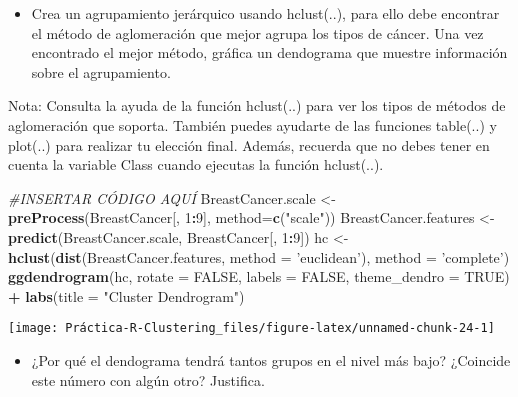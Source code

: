 \documentclass[]{article}
\newenvironment{Shaded}{\begin{snugshade}}{\end{snugshade}}
\newcommand{\CommentTok}[1]{\textcolor[rgb]{0.56,0.35,0.01}{\textit{#1}}}
\newcommand{\DataTypeTok}[1]{\textcolor[rgb]{0.13,0.29,0.53}{#1}}
\newcommand{\DecValTok}[1]{\textcolor[rgb]{0.00,0.00,0.81}{#1}}
\newcommand{\KeywordTok}[1]{\textcolor[rgb]{0.13,0.29,0.53}{\textbf{#1}}}
\newcommand{\NormalTok}[1]{#1}
\newcommand{\OperatorTok}[1]{\textcolor[rgb]{0.81,0.36,0.00}{\textbf{#1}}}
\newcommand{\OtherTok}[1]{\textcolor[rgb]{0.56,0.35,0.01}{#1}}
\newcommand{\StringTok}[1]{\textcolor[rgb]{0.31,0.60,0.02}{#1}}
\providecommand{\tightlist}{%
  \setlength{\itemsep}{0pt}\setlength{\parskip}{0pt}}
\begin{document}
\begin{itemize}
\tightlist
\item
  Crea un agrupamiento jerárquico usando hclust(..), para ello debe
  encontrar el método de aglomeración que mejor agrupa los tipos de
  cáncer. Una vez encontrado el mejor método, gráfica un dendograma que
  muestre información sobre el agrupamiento.
\end{itemize}

Nota: Consulta la ayuda de la función hclust(..) para ver los tipos de
métodos de aglomeración que soporta. También puedes ayudarte de las
funciones table(..) y plot(..) para realizar tu elección final. Además,
recuerda que no debes tener en cuenta la variable Class cuando ejecutas
la función hclust(..).

\begin{Shaded}
\begin{Highlighting}[]
\CommentTok{#INSERTAR CÓDIGO AQUÍ}
\NormalTok{BreastCancer.scale <-}\StringTok{ }\KeywordTok{preProcess}\NormalTok{(BreastCancer[, }\DecValTok{1}\OperatorTok{:}\DecValTok{9}\NormalTok{], }\DataTypeTok{method=}\KeywordTok{c}\NormalTok{(}\StringTok{"scale"}\NormalTok{))}
\NormalTok{BreastCancer.features <-}\StringTok{ }\KeywordTok{predict}\NormalTok{(BreastCancer.scale, BreastCancer[, }\DecValTok{1}\OperatorTok{:}\DecValTok{9}\NormalTok{])}
\NormalTok{hc <-}\StringTok{ }\KeywordTok{hclust}\NormalTok{(}\KeywordTok{dist}\NormalTok{(BreastCancer.features, }\DataTypeTok{method =} \StringTok{'euclidean'}\NormalTok{), }\DataTypeTok{method =} \StringTok{'complete'}\NormalTok{)}
\KeywordTok{ggdendrogram}\NormalTok{(hc, }\DataTypeTok{rotate =} \OtherTok{FALSE}\NormalTok{, }\DataTypeTok{labels =} \OtherTok{FALSE}\NormalTok{, }\DataTypeTok{theme_dendro =} \OtherTok{TRUE}\NormalTok{) }\OperatorTok{+}\StringTok{ }
\StringTok{  }\KeywordTok{labs}\NormalTok{(}\DataTypeTok{title =} \StringTok{"Cluster Dendrogram"}\NormalTok{)}
\end{Highlighting}
\end{Shaded}

\begin{center}\texttt{[image: Práctica-R-Clustering\_files/figure-latex/unnamed-chunk-24-1]} \end{center}

\begin{itemize}
\tightlist
\item
  ¿Por qué el dendograma tendrá tantos grupos en el nivel más bajo?
  ¿Coincide este número con algún otro? Justifica.
\end{itemize}
\end{document}
